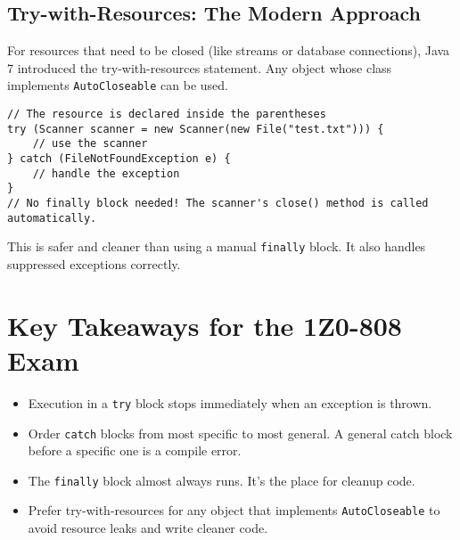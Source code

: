 \documentclass[12pt]{article}
\begin{document}
\begin{enumerate}[label=(\arabic*)]
\subsection{Try-with-Resources: The Modern Approach}
For resources that need to be closed (like streams or database connections), Java 7 introduced the try-with-resources statement. Any object whose class implements \texttt{AutoCloseable} can be used.
\begin{verbatim}
// The resource is declared inside the parentheses
try (Scanner scanner = new Scanner(new File("test.txt"))) {
    // use the scanner
} catch (FileNotFoundException e) {
    // handle the exception
}
// No finally block needed! The scanner's close() method is called automatically.
\end{verbatim}
This is safer and cleaner than using a manual \texttt{finally} block. It also handles suppressed exceptions correctly.

\section*{Key Takeaways for the 1Z0-808 Exam}
\begin{itemize}
    \item Execution in a \texttt{try} block stops immediately when an exception is thrown.
    \item Order \texttt{catch} blocks from most specific to most general. A general catch block before a specific one is a compile error.
    \item The \texttt{finally} block almost always runs. It's the place for cleanup code.
    \item Prefer try-with-resources for any object that implements \texttt{AutoCloseable} to avoid resource leaks and write cleaner code.
\end{itemize}
\end{enumerate}
\end{document}
